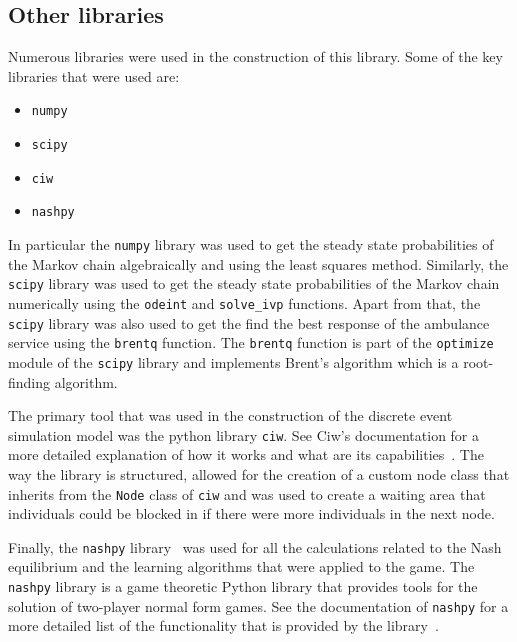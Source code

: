 \subsection{Other libraries}

Numerous libraries were used in the construction of this library.
Some of the key libraries that were used are:

\begin{itemize}
    \item \texttt{numpy}~\cite{2020NumPy-Array}
    \item \texttt{scipy}~\cite{2020SciPy-NMeth}
    \item \texttt{ciw}~\cite{ciwpython}
    \item \texttt{nashpy}~\cite{thenashpyproject}
\end{itemize}

In particular the \texttt{numpy} library was used to get the steady state
probabilities of the Markov chain algebraically and using the least squares
method.
Similarly, the \texttt{scipy} library was used to get the steady state
probabilities of the Markov chain numerically using the \texttt{odeint} and
\texttt{solve\_ivp} functions.
Apart from that, the \texttt{scipy} library was also used to get the find
the best response of the ambulance service using the \texttt{brentq} function.
The \texttt{brentq} function is part of the \texttt{optimize} module of the
\texttt{scipy} library and implements Brent's algorithm which is a
root-finding algorithm. 

The primary tool that was used in the construction of the discrete event
simulation model was the python library \texttt{ciw}.
See Ciw's documentation for a more detailed explanation of how it works and
what are its capabilities~\cite{ciwpython}.
The way the library is structured, allowed for the creation of a custom
node class that inherits from the \texttt{Node} class of \texttt{ciw} and
was used to create a waiting area that individuals could be blocked in if
there were more individuals in the next node.

Finally, the \texttt{nashpy} library~\cite{thenashpyproject} was used for all
the calculations related to the Nash equilibrium and the learning algorithms
that were applied to the game.
The \texttt{nashpy} library is a game theoretic Python library that provides
tools for the solution of two-player normal form games.
See the documentation of \texttt{nashpy} for a more detailed list of the
functionality that is provided by the library~\cite{thenashpyproject}.
